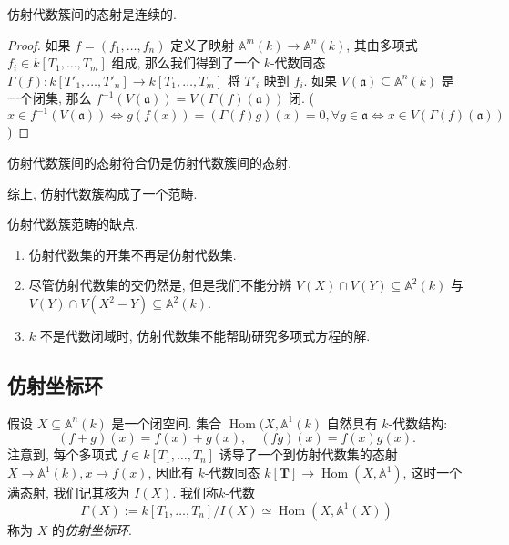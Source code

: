 \begin{proposition}
  仿射代数簇间的态射是连续的.
\end{proposition}
\begin{proof}
  如果 \( f = (f_1, \ldots, f_n) \) 定义了映射 \( \mathbb{A}^m(k) \to
  \mathbb{A}^n(k) \), 其由多项式 \( f_i \in k[T_1, \ldots, T_m] \) 组成,
  那么我们得到了一个 \( k \)-代数同态 \( \Gamma(f): k[T'_1, \ldots, T'_n] \to
  k[T_1, \ldots, T_m] \) 将 \( T'_i \) 映到 \( f_i \).
  如果 \( V(\mathfrak{a}) \subseteq \mathbb{A}^n(k) \) 是一个闭集, 那么 \(
  f^{-1}(V(\mathfrak{a})) = V(\Gamma(f)(\mathfrak{a})) \) 闭.
  (\( x \in f^{-1}(V(\mathfrak{a})) \iff  g(f(x)) = (\Gamma(f) g)(x) = 0,
  \forall g \in \mathfrak{a} \iff x \in V(\Gamma(f)(\mathfrak{a})) \))
\end{proof}
\begin{proposition}
  仿射代数簇间的态射符合仍是仿射代数簇间的态射.
\end{proposition}
综上, 仿射代数簇构成了一个范畴.

\begin{remark}
  仿射代数簇范畴的缺点.
  \begin{enumerate}
    \item 仿射代数集的开集不再是仿射代数集.
    \item 尽管仿射代数集的交仍然是, 但是我们不能分辨 \( V(X) \cap V(Y) \subseteq
      \mathbb{A}^2(k) \) 与 \( V(Y) \cap V(X^2 - Y) \subseteq \mathbb{A}^2(k)
      \). %
    \item \( k \) 不是代数闭域时, 仿射代数集不能帮助研究多项式方程的解.
  \end{enumerate}
\end{remark}

\subsection{仿射坐标环}

假设 \( X \subseteq \mathbb{A}^n(k) \) 是一个闭空间. 集合 \( \operatorname{Hom}(X, \mathbb{A}^1(k) \) 自然具有 \( k
\)-代数结构:
\[
  (f + g)(x) = f(x) + g(x),\quad (fg) (x) = f(x) g(x).
\]
注意到, 每个多项式 \( f \in k[T_1, \ldots, T_n] \) 诱导了一个到仿射代数集的态射
\( X \to \mathbb{A}^1(k), x \mapsto f(x) \), 因此有 \( k \)-代数同态 \(
k[\mathbf{T}] \to \operatorname{Hom}(X, \mathbb{A}^1) \), 这时一个满态射,
我们记其核为 \( I(X) \). 我们称\( k \)-代数
\begin{equation}
  \Gamma(X) := k[T_1,\ldots, T_n] / I(X) \simeq \operatorname{Hom}(X,
  \mathbb{A}^1(X))
  \label{equation-affine-coordinate-ring}
\end{equation}
称为 \( X \) 的\emph{仿射坐标环}.

